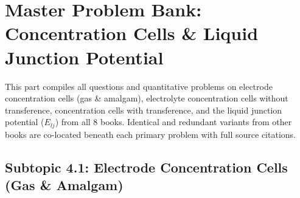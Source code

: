 \chapter{Master Problem Bank: Concentration Cells \& Liquid Junction Potential}
\label{chap:qb_concentration_cells}

\begin{tcolorbox}[enhanced,colback=subtleblue,colframe=primarynavy,arc=2mm,boxrule=1pt,
    title=\textbf{\large Part IV Organization: Concentration Cells \& Liquid Junction Potential}]
This part compiles all questions and quantitative problems on electrode concentration cells (gas \& amalgam), electrolyte concentration cells without transference, concentration cells with transference, and the liquid junction potential ($E_{lj}$) from all 8 books. Identical and redundant variants from other books are co-located beneath each primary problem with full source citations.
\end{tcolorbox}

\section{Subtopic 4.1: Electrode Concentration Cells (Gas \& Amalgam)}

